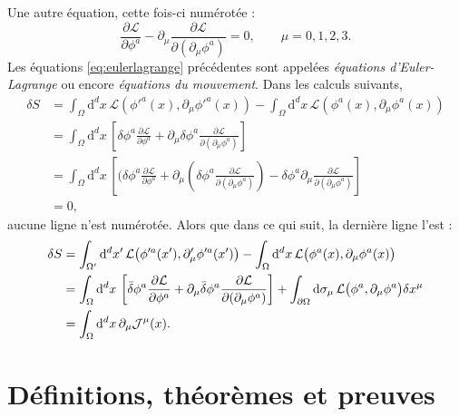 \documentclass[11pt,twoside,maitrise]{dms}
\theoremstyle{definition}
\numberwithin{equation}{section}
\numberwithin{table}{chapter}
\numberwithin{figure}{chapter}
\begin{document}
Une autre équation, cette fois-ci numérotée :
\begin{equation}
    \label{eq:eulerlagrange}
    \frac{\partial\mathcal{L}}{\partial\phi^a}-\partial_\mu\frac{\partial\mathcal{L}}{\partial(\partial_\mu\phi^a)}=0,\qquad\mu=0,1,2,3.
\end{equation}
Les équations \eqref{eq:eulerlagrange} précédentes sont appelées \emph{équations d'Euler-Lagrange} ou encore \emph{équations du mouvement}. Dans les calculs suivants,
\begin{align*}
  \delta S
    & = \int_\Omega \mathrm{d}^dx\, \mathcal{L}\left(\phi'^a(x), \partial_\mu\phi'^a(x)\right)
        - \int_\Omega \mathrm{d}^dx\, \mathcal{L}\left(\phi^a(x), \partial_\mu\phi^a(x)\right)\\
    & = \int_\Omega \mathrm{d}^dx\, \left[\delta \phi^a \frac{\partial\mathcal{L}}{\partial\phi^a}
        + \partial_\mu \delta\phi^a \frac{\partial\mathcal{L}}{\partial(\partial_\mu\phi^a)}\right]\\
    & = \int_\Omega \mathrm{d}^dx\, \left[(\delta\phi^a \frac{\partial\mathcal{L}}{\partial\phi^a}
       + \partial_\mu \left(\delta \phi^a \frac{\partial\mathcal{L}}{\partial(\partial_\mu\phi^a)}\right)
       - \delta\phi^a \partial_\mu \frac{\partial\mathcal{L}}{\partial(\partial_\mu\phi^a)}\right]\\
    & = 0,
\end{align*}
aucune ligne n'est numérotée. Alors que dans ce qui suit, la derni\`ere ligne l'est :
\begin{align}
  \delta S
    &= \int_{\Omega'} \mathrm{d}^dx' \,\mathcal{L}\bigl(\phi'^a(x'), \partial'_\mu\phi'^a(x')\bigr)
        - \int_\Omega\mathrm{d}^dx\,\mathcal{L}\bigl(\phi^a(x),\partial_\mu\phi^a(x)\bigr)
        \notag\\
    & = \int_\Omega \mathrm{d}^dx \,\left[\bar{\delta}\phi^a \frac{\partial\mathcal{L}}{\partial\phi^a}
        + \partial_\mu \bar{\delta} \phi^a \frac{\partial\mathcal{L}}{\partial(\partial_\mu\phi^a)}\right]
        + \int_{\partial\Omega}\mathrm{d} \sigma_\mu\,\mathcal{L}
        \bigl(\phi^a,\partial_\mu\phi^a\bigr)\delta x^\mu
        \notag\\
    & = \int_\Omega\mathrm{d}^dx\,\partial_\mu\mathcal{J}^\mu(x).
        \label{eq:variationaction}
\end{align}

\section{Définitions, théorèmes et preuves}
\end{document}
